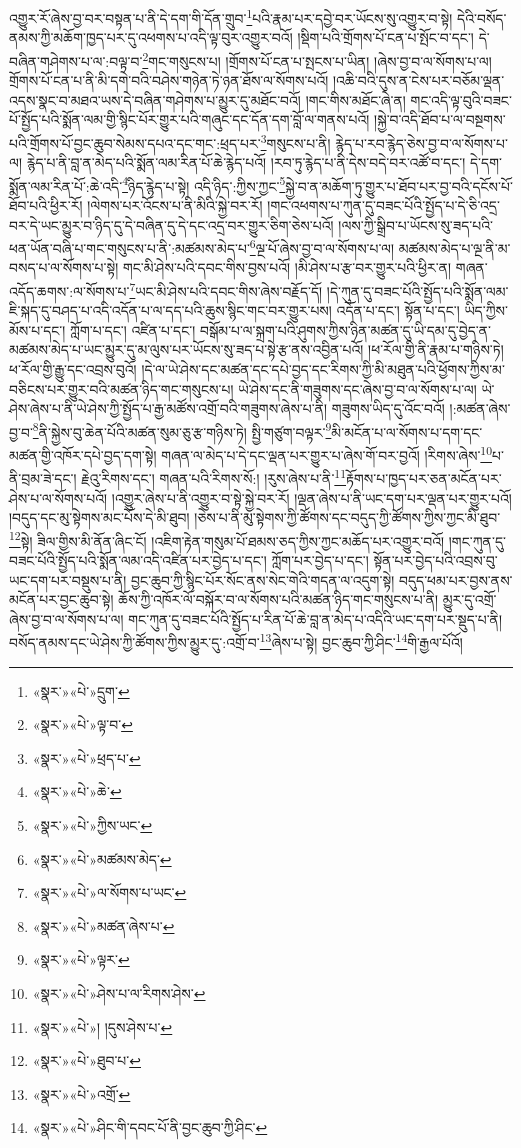 འགྱུར་རོ་ཞེས་བྱ་བར་བསྟན་པ་ནི་དེ་དག་གི་དོན་གྲུབ་\footnote{«སྣར་»«པེ་»དྲུག་}པའི་རྣམ་པར་དབྱེ་བར་ཡོངས་སུ་འགྱུར་བ་སྟེ། དེའི་བསོད་ནམས་ཀྱི་མཆོག་ཁྱད་པར་དུ་འཕགས་པ་འདི་ལྟ་བུར་འགྱུར་བའོ། །སྡིག་པའི་གྲོགས་པོ་ངན་པ་སྤོང་བ་དང་། དེ་བཞིན་གཤེགས་པ་ལ་:བལྟ་བ་\footnote{«སྣར་»«པེ་»ལྟ་བ་}གང་གསུངས་པ། །གྲོགས་པོ་ངན་པ་སྤངས་པ་ཡིན། །ཞེས་བྱ་བ་ལ་སོགས་པ་ལ། གྲོགས་པོ་ངན་པ་ནི་མི་དགེ་བའི་བཤེས་གཉེན་ཏེ་ཉན་ཐོས་ལ་སོགས་པའོ། །འཆི་བའི་དུས་ན་ངེས་པར་བཅོམ་ལྡན་འདས་སྣང་བ་མཐའ་ཡས་དེ་བཞིན་གཤེགས་པ་མྱུར་དུ་མཐོང་བའོ། །གང་གིས་མཐོང་ཞེ་ན། གང་འདི་ལྟ་བུའི་བཟང་པོ་སྤྱོད་པའི་སྨོན་ལམ་གྱི་སྙིང་པོར་གྱུར་པའི་གཞུང་དང་དོན་དག་བློ་ལ་གནས་པའོ། །སྐྱེ་བ་འདི་ཐོབ་པ་ལ་བསྔགས་པའི་གྲོགས་པོ་བྱང་ཆུབ་སེམས་དཔའ་དང་གང་:ཕྲད་པར་\footnote{«སྣར་»«པེ་»ཕྲད་པ་}གསུངས་པ་ནི། རྙེད་པ་རབ་རྙེད་ཅེས་བྱ་བ་ལ་སོགས་པ་ལ། རྙེད་པ་ནི་བླ་ན་མེད་པའི་སྨོན་ལམ་རིན་པོ་ཆེ་རྙེད་པའོ། །རབ་ཏུ་རྙེད་པ་ནི་དེས་བདེ་བར་འཚོ་བ་དང་། དེ་དག་སྨོན་ལམ་རིན་པོ་:ཆེ་འདི་\footnote{«སྣར་»«པེ་»ཆེ་}ཉིད་རྙེད་པ་སྟེ། འདི་ཉིད་:ཀྱིས་ཀྱང་\footnote{«སྣར་»«པེ་»ཀྱིས་ཡང་}སྐྱེ་བ་ན་མཆོག་ཏུ་གྱུར་པ་ཐོབ་པར་བྱ་བའི་དངོས་པོ་ཐོབ་པའི་ཕྱིར་རོ། །ལེགས་པར་འོངས་པ་ནི་མིའི་སྐྱེ་བར་རོ། །གང་འཕགས་པ་ཀུན་དུ་བཟང་པོའི་སྤྱོད་པ་དེ་ཅི་འདྲ་བར་དེ་ཡང་མྱུར་བ་ཉིད་དུ་དེ་བཞིན་དུ་དེ་དང་འདྲ་བར་གྱུར་ཅིག་ཅེས་པའོ། །ལས་ཀྱི་སྒྲིབ་པ་ཡོངས་སུ་ཟད་པའི་ཕན་ཡོན་བཞི་པ་གང་གསུངས་པ་ནི་:མཚམས་མེད་པ་\footnote{«སྣར་»«པེ་»མཚམས་མེད་}ལྔ་པོ་ཞེས་བྱ་བ་ལ་སོགས་པ་ལ། མཚམས་མེད་པ་ལྔ་ནི་མ་བསད་པ་ལ་སོགས་པ་སྟེ། གང་མི་ཤེས་པའི་དབང་གིས་བྱས་པའོ། །མི་ཤེས་པ་རྩ་བར་གྱུར་པའི་ཕྱིར་ན། གཞན་འདོད་ཆགས་:ལ་སོགས་པ་\footnote{«སྣར་»«པེ་»ལ་སོགས་པ་ཡང་}ཡང་མི་ཤེས་པའི་དབང་གིས་ཞེས་བརྗོད་དོ། །དེ་ཀུན་དུ་བཟང་པོའི་སྤྱོད་པའི་སྨོན་ལམ་ཇི་སྐད་དུ་བཤད་པ་འདི་འདོན་པ་ལ་དད་པའི་ཆུས་སྙིང་གང་བར་གྱུར་པས། འདོན་པ་དང་། སྟོན་པ་དང་། ཡིད་ཀྱིས་མོས་པ་དང་། ཀློག་པ་དང་། འཛིན་པ་དང་། བསྒོམ་པ་ལ་སྐྲག་པའི་ཤུགས་ཀྱིས་ཉིན་མཚན་དུ་ཡི་དམ་དུ་བྱེད་ན་མཚམས་མེད་པ་ཡང་མྱུར་དུ་མ་ལུས་པར་ཡོངས་སུ་ཟད་པ་སྟེ་རྩ་ནས་འབྱིན་པའོ། །ཕ་རོལ་གྱི་ནི་རྣམ་པ་གཉིས་ཏེ། ཕ་རོལ་གྱི་རྒྱུ་དང་འབྲས་བུའོ། །དེ་ལ་ཡེ་ཤེས་དང་མཚན་དང་དཔེ་བྱད་དང་རིགས་ཀྱི་མི་མཐུན་པའི་ཕྱོགས་ཀྱིས་མ་བཅིངས་པར་གྱུར་བའི་མཚན་ཉིད་གང་གསུངས་པ། ཡེ་ཤེས་དང་ནི་གཟུགས་དང་ཞེས་བྱ་བ་ལ་སོགས་པ་ལ། ཡེ་ཤེས་ཞེས་པ་ནི་ཡེ་ཤེས་ཀྱི་སྤྱོད་པ་རྒྱ་མཚོས་འགྲོ་བའི་གཟུགས་ཞེས་པ་ནི། གཟུགས་ཡིད་དུ་འོང་བའོ། །:མཚན་ཞེས་བྱ་བ་\footnote{«སྣར་»«པེ་»མཚན་ཞེས་པ་}ནི་སྐྱེས་བུ་ཆེན་པོའི་མཚན་སུམ་ཅུ་རྩ་གཉིས་ཏེ། སྤྱི་གཙུག་བལྟར་\footnote{«སྣར་»«པེ་»ལྟར་}མི་མངོན་པ་ལ་སོགས་པ་དག་དང་མཚན་གྱི་འཁོར་དཔེ་བྱད་དག་སྟེ། གཞན་ལ་མེད་པ་དེ་དང་ལྡན་པར་གྱུར་པ་ཞེས་གོ་བར་བྱའོ། །རིགས་ཞེས་\footnote{«སྣར་»«པེ་»ཤེས་པ་ལ་རིགས་ཤེས་}པ་ནི་བྲམ་ཟེ་དང་། རྗེའུ་རིགས་དང་། གཞན་པའི་རིགས་སོ:། །རུས་ཞེས་པ་ནི་\footnote{«སྣར་»«པེ་»། །དུས་ཤེས་པ་}རྟོགས་པ་ཁྱད་པར་ཅན་མངོན་པར་ཤེས་པ་ལ་སོགས་པའོ། །འགྱུར་ཞེས་པ་ནི་འགྱུར་བ་སྟེ་སྐྱེ་བར་རོ། །ལྡན་ཞེས་པ་ནི་ཡང་དག་པར་ལྡན་པར་གྱུར་པའོ། །བདུད་དང་མུ་སྟེགས་མང་པོས་དེ་མི་ཐུབ། །ཅེས་པ་ནི་མུ་སྟེགས་ཀྱི་ཚོགས་དང་བདུད་ཀྱི་ཚོགས་ཀྱིས་ཀྱང་མི་ཐུབ་\footnote{«སྣར་»«པེ་»ཐུབ་པ་}སྟེ། ཟིལ་གྱིས་མི་ནོན་ཞིང་ངོ། །འཇིག་རྟེན་གསུམ་པོ་ཐམས་ཅད་ཀྱིས་ཀྱང་མཆོད་པར་འགྱུར་བའོ། །གང་ཀུན་དུ་བཟང་པོའི་སྤྱོད་པའི་སྨོན་ལམ་འདི་འཛིན་པར་བྱེད་པ་དང་། ཀློག་པར་བྱེད་པ་དང་། སྟོན་པར་བྱེད་པའི་འབྲས་བུ་ཡང་དག་པར་བསྡུས་པ་ནི། བྱང་ཆུབ་ཀྱི་སྙིང་པོར་སོང་ནས་སེང་གེའི་གདན་ལ་འདུག་སྟེ། བདུད་ཕམ་པར་བྱས་ནས་མངོན་པར་བྱང་ཆུབ་སྟེ། ཆོས་ཀྱི་འཁོར་ལོ་བསྐོར་བ་ལ་སོགས་པའི་མཚན་ཉིད་གང་གསུངས་པ་ནི། མྱུར་དུ་འགྲོ་ཞེས་བྱ་བ་ལ་སོགས་པ་ལ། གང་ཀུན་དུ་བཟང་པོའི་སྤྱོད་པ་རིན་པོ་ཆེ་བླ་ན་མེད་པ་འདིའི་ཡང་དག་པར་སྡུད་པ་ནི། བསོད་ནམས་དང་ཡེ་ཤེས་ཀྱི་ཚོགས་ཀྱིས་མྱུར་དུ་:འགྲོ་བ་\footnote{«སྣར་»«པེ་»འགྲོ་}ཞེས་པ་སྟེ། བྱང་ཆུབ་ཀྱི་ཤིང་\footnote{«སྣར་»«པེ་»ཤིང་གི་དབང་པོ་ནི་བྱང་ཆུབ་ཀྱི་ཤིང་}གི་རྒྱལ་པོའོ། 